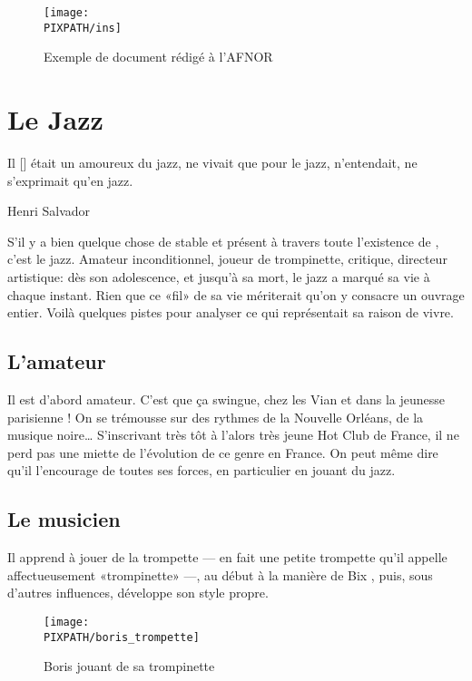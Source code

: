 \begin{figure}
\centering
\texttt{[image: \\PIXPATH/ins]}
\caption{Exemple de document rédigé à l'AFNOR}
\label{ins}
\end{figure}


\section{Le Jazz}
\epigraph{Il [\BV] était un amoureux du jazz, ne vivait que pour le jazz, n'entendait, ne s'exprimait qu'en jazz.}
{Henri Salvador}

S'il y a bien quelque chose de stable et présent à travers toute l'existence de \BV, c'est le jazz.
Amateur inconditionnel, joueur de trompinette, critique, directeur artistique: dès son adolescence, et
jusqu'à sa mort, le jazz a marqué sa vie à chaque instant. Rien que ce «fil» de sa vie mériterait
qu'on y consacre un ouvrage entier. Voilà quelques pistes pour analyser ce qui représentait
sa raison de vivre.

\subsection{L'amateur}

Il est d'abord amateur. C'est que ça swingue, chez les Vian et dans la jeunesse parisienne !
On se trémousse sur des rythmes de la Nouvelle Orléans, de la musique noire\ldots
S'inscrivant très tôt à l'alors très jeune Hot Club de France, il ne perd
pas une miette de l'évolution de ce genre en France. On peut même dire
qu'il l'encourage de toutes ses forces, en particulier en jouant du jazz.

\subsection{Le musicien}

Il apprend à jouer de la trompette --- en fait une petite trompette qu'il appelle affectueusement «trompinette» ---,
au début à la manière de Bix , puis, sous d'autres influences, développe
son style propre.

\begin{figure}
\centering
\texttt{[image: \\PIXPATH/boris\_trompette]}
\caption{Boris jouant de sa trompinette}
\end{figure}

